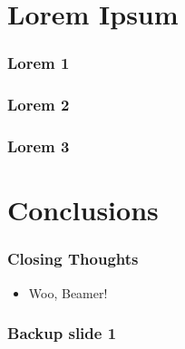 \documentclass[xcolor={table}]{beamer}
\begin{document}
	\section{Lorem Ipsum}
		\begin{frame}
			\frametitle{Lorem 1}
		\end{frame}

		\begin{frame}
			\frametitle{Lorem 2}
		\end{frame}

		\begin{frame}
			\frametitle{Lorem 3}
		\end{frame}

	\section{Conclusions}
		\begin{frame}
			\frametitle{Closing Thoughts}
			\begin{itemize}
				\item Woo, Beamer!
			\end{itemize}
		\end{frame}
	
	\appendix

	\backupbegin
	  \begin{frame}
	    \frametitle{Backup slide 1}
	  \end{frame}
	\backupend
\end{document}
